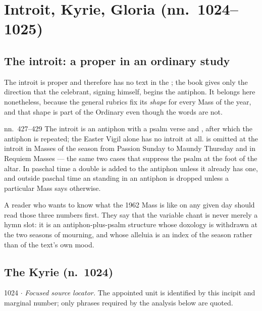 \section{Introit, Kyrie, Gloria (nn.~1024--1025)}

\subsection*{The introit: a proper in an ordinary study}

The introit is proper and therefore has no text in the ; the
book gives only the direction that the celebrant, signing himself, begins the
antiphon. It belongs here nonetheless, because the general rubrics fix its
\emph{shape} for every Mass of the year, and that shape is part of the
Ordinary even though the words are not.

\begin{rubricnote}{ nn.~427--429}
The introit is an antiphon with a psalm verse and ,
after which the antiphon is repeated; the Easter Vigil alone has no introit at
all.  is omitted at the introit in Masses of the season
from Passion Sunday to Maundy Thursday and in Requiem Masses --- the same two
cases that suppress the psalm at the foot of the altar. In paschal time a
double  is added to the antiphon unless it already has one,
and outside paschal time an  standing in an antiphon is
dropped unless a particular Mass says otherwise.
\end{rubricnote}

A reader who wants to know what the 1962 Mass is like on any given day should
read those three numbers first. They say that the variable chant is never
merely a hymn slot: it is an antiphon-plus-psalm structure whose doxology is
withdrawn at the two seasons of mourning, and whose alleluia is an index of
the season rather than of the text's own mood.

\subsection*{The Kyrie (n.~1024)}

\begin{appointed}{1024 $\cdot$ }
\textit{Focused source locator.} The appointed unit is identified by this incipit and marginal number; only phrases required by the analysis below are quoted.
\end{appointed}

